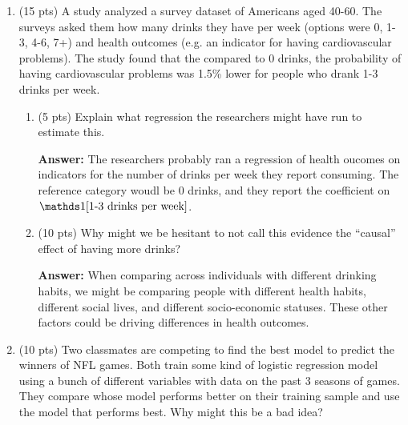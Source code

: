 \documentclass[12pt]{article}
\newcommand{\answer}[1]{{\color{blue_winged_teal}\textbf{Answer:} #1}}
\newcommand{\pts}[1]{{\color{zinc500}(#1 pts)}}
\begin{document}
\begin{enumerate}
\begin{enumerate}
      \item \pts{10} Say you want to let the relationship between height and points scored vary by position. Describe the regression you could run that would estimate different slopes by position, i.e. what terms would you include in your model?

        \answer{
          We could run a regression with the following terms:
          \begin{enumerate}
            \item Height
            \item Position indicators
            \item Height interacted with position indicators
          \end{enumerate}
          This would allow us to estimate different slopes for each position.
        }
    \end{enumerate}

    \bigskip
  \item \pts{15} A study analyzed a survey dataset of Americans aged 40-60. The surveys asked them how many drinks they have per week (options were 0, 1-3, 4-6, 7+) and health outcomes (e.g. an indicator for having cardiovascular problems).
    The study found that the compared to 0 drinks, the probability of having cardiovascular problems was 1.5\% lower for people who drank 1-3 drinks per week.
    \begin{enumerate}
      \item \pts{5} Explain what regression the researchers might have run to estimate this.

        \answer{
          The researchers probably ran a regression of health oucomes on indicators for the number of drinks per week they report consuming.
          The reference category woudl be 0 drinks, and they report the coefficient on $\one{\text{1-3 drinks per week}}$.
        }

      \item \pts{10} Why might we be hesitant to not call this evidence the ``causal'' effect of having more drinks?

        \answer{
          When comparing across individuals with different drinking habits, we might be comparing people with different health habits, different social lives, and different socio-economic statuses.
          These other factors could be driving differences in health outcomes.
        }
    \end{enumerate}

    \bigskip
  \item \pts{10} Two classmates are competing to find the best model to predict the winners of NFL games. Both train some kind of logistic regression model using a bunch of different variables with data on the past 3 seasons of games. They compare whose model performs better on their training sample and use the model that performs best. Why might this be a bad idea?


\end{enumerate}
\end{document}
